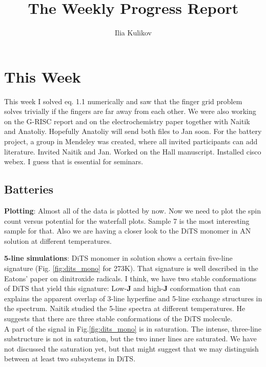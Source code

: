 \documentclass[12pt,a4paper]{report}
\begin{document}
\title{%
  \large The Weekly Progress Report \\
    }

\author{Ilia Kulikov}


\setcounter{chapter}{+1}
\maketitle

\section{This Week}
This week I solved eq. 1.1 numerically and saw that the finger grid problem solves trivially if the fingers are far away from each other. We were also working on the G-RISC report and on the electrochemistry paper together with Naitik and Anatoliy. Hopefully Anatoliy will send both files to Jan soon. For the battery project, a group in Mendeley was created, where all invited participants can add literature. Invited Naitik and Jan. Worked on the Hall manuscript. Installed cisco webex. I guess that is essential for seminars.\\
\subsection{Batteries}
\par \textbf{Plotting}: Almost all of the data is plotted by now. Now we need to plot the spin count versus potential for the waterfall plots. Sample 7 is the most interesting sample for that. Also we are having a closer look to the DiTS monomer in AN solution at different temperatures.\\
\par \textbf{5-line simulations}: DiTS monomer in solution shows a certain five-line signature (Fig. \ref{fig:dits_mono} for 273K). That signature is well described in the Eatons' paper on dinitroxide radicals. I think, we have two stable conformations of DiTS that yield this signature: Low-\textbf{J} and high-\textbf{J} conformation that can explains the apparent overlap of 3-line hyperfine and 5-line exchange structures in the spectrum. Naitik studied the 5-line spectra at different temperatures. He suggests that there are three stable conformations of the DiTS molecule.\\ 
A part of the signal in Fig.\ref{fig:dits_mono} is in saturation. The intense, three-line substructure is not in saturation, but the two inner lines are saturated. We have not discussed the saturation yet, but that might suggest that we may distinguish between at least two subsystems in DiTS.\\
\end{document}
